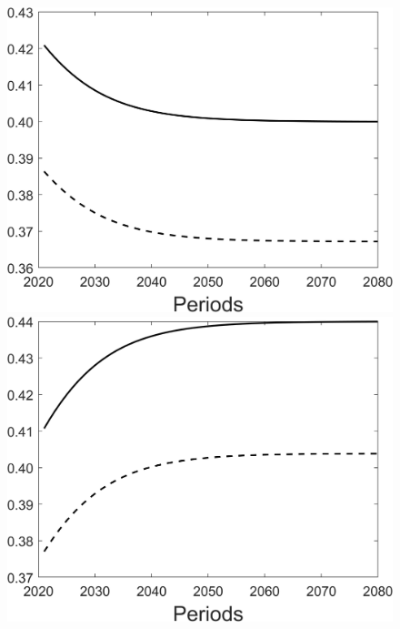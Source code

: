 \begin{figure}[h!!]
\begin{minipage}[]{0.32\textwidth}
		\includegraphics[width=1\textwidth]{../../codding_model/Own/figures/Rep_agent/staticBAU_LF_separate_hh_periods59_eppsilon4.00_zeta1.40_Ad08_Ac04_thetac0.70_thetad0.56_HetGrowth1_tauul0.181_util0_withtarget0_lgd0.png}
	\end{minipage}
	\begin{minipage}[]{0.32\textwidth}
		\includegraphics[width=1\textwidth]{../../codding_model/Own/figures/Rep_agent/staticBAU_LF_separate_hl_periods59_eppsilon4.00_zeta1.40_Ad08_Ac04_thetac0.70_thetad0.56_HetGrowth1_tauul0.181_util0_withtarget0_lgd0.png}

\end{minipage}
\end{figure}
